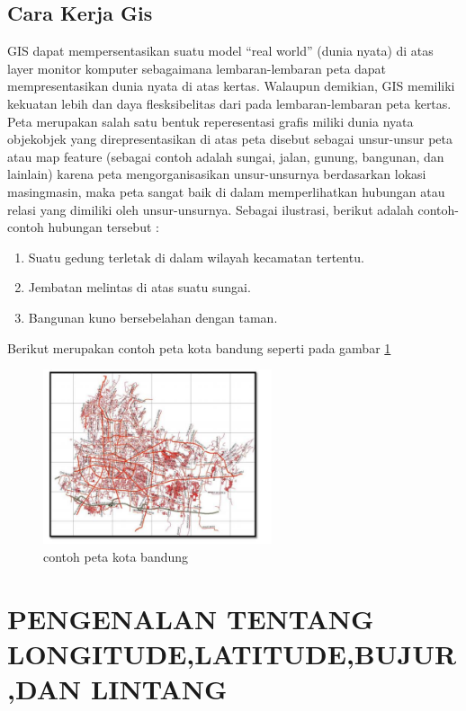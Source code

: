 \subsection{Cara Kerja Gis}
 GIS dapat mempersentasikan suatu model “real world” (dunia nyata) di atas layer monitor komputer sebagaimana lembaran-lembaran peta dapat mempresentasikan dunia nyata di atas kertas. Walaupun demikian, GIS memiliki kekuatan lebih dan daya flesksibelitas dari pada lembaran-lembaran peta kertas. Peta merupakan salah satu bentuk reperesentasi grafis miliki dunia nyata objekobjek yang direpresentasikan di atas peta disebut sebagai unsur-unsur peta atau map feature (sebagai contoh adalah sungai, jalan, gunung, bangunan, dan lainlain) karena peta mengorganisasikan unsur-unsurnya berdasarkan lokasi masingmasin, maka peta sangat baik di dalam memperlihatkan hubungan atau relasi yang dimiliki oleh unsur-unsurnya. Sebagai ilustrasi, berikut adalah contoh-contoh hubungan tersebut :
\begin{enumerate}
\item Suatu gedung terletak di dalam wilayah kecamatan tertentu.
\item Jembatan melintas di atas suatu sungai.
\item Bangunan kuno bersebelahan dengan taman.
\end{enumerate}
Berikut merupakan contoh peta kota bandung seperti pada gambar \ref{kotapetabandung}
\begin{figure}[ht]
	\centerline{\includegraphics[width=0.60\textwidth]{pictures/bnd.jpg}}
	\caption{contoh peta kota bandung}
	\label{kotapetabandung}
	\end{figure}

\section{PENGENALAN TENTANG LONGITUDE,LATITUDE,BUJUR,DAN LINTANG}
